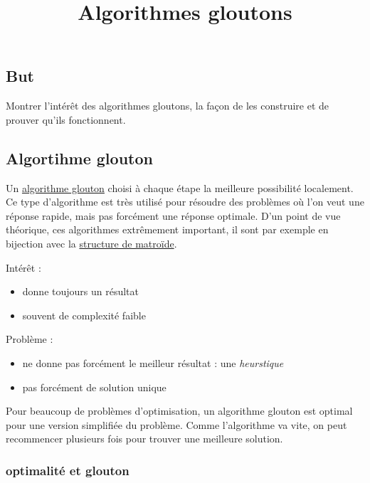\documentclass[
]{article}
\title{Algorithmes gloutons}
\author{}
\date{}
\providecommand{\tightlist}{%
  \setlength{\itemsep}{0pt}\setlength{\parskip}{0pt}}
\begin{document}
\maketitle

\hypertarget{but}{%
\subsection{But}\label{but}}

Montrer l'intérêt des algorithmes gloutons, la façon de les construire
et de prouver qu'ils fonctionnent.

\hypertarget{algortihme-glouton}{%
\subsection{Algortihme glouton}\label{algortihme-glouton}}

Un \href{https://fr.wikipedia.org/wiki/Algorithme_glouton}{algorithme
glouton} choisi à chaque étape la meilleure possibilité localement. Ce
type d'algorithme est très utilisé pour résoudre des problèmes où l'on
veut une réponse rapide, mais pas forcément une réponse optimale. D'un
point de vue théorique, ces algorithmes extrêmement important, il sont
par exemple en bijection avec la
\href{https://fr.wikipedia.org/wiki/Matro\%C3\%AFde}{structure de
matroïde}.

Intérêt :

\begin{itemize}
\tightlist
\item
  donne toujours un résultat
\item
  souvent de complexité faible
\end{itemize}

Problème :

\begin{itemize}
\tightlist
\item
  ne donne pas forcément le meilleur résultat : une \emph{heurstique}
\item
  pas forcément de solution unique
\end{itemize}

Pour beaucoup de problèmes d'optimisation, un algorithme glouton est
optimal pour une version simplifiée du problème. Comme l'algorithme va
vite, on peut recommencer plusieurs fois pour trouver une meilleure
solution.

\hypertarget{optimalituxe9-et-glouton}{%
\subsubsection{optimalité et glouton}\label{optimalituxe9-et-glouton}}
\end{document}

